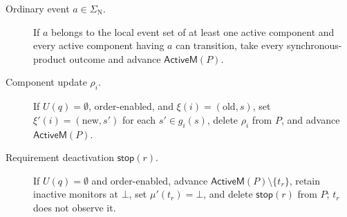 \documentclass[acmsmall,screen,review,anonymous]{acmart}
\newcommand{\ActT}{\mathsf{ActiveM}}
\newcommand{\SigmaN}{\Sigma_{\mathrm{N}}}
\newcommand{\ustop}[1]{\mathsf{stop}(#1)}
\begin{document}
\begin{definition}
\begin{description}
  \item[Ordinary event $a\in\SigmaN$.]
  If $a$ belongs to the local event set of at least one active component and every active component having $a$ can transition, take every synchronous-product outcome and advance $\ActT(P)$.

  \item[Component update $\rho_i$.]
  If $U(q)=\emptyset$, order-enabled, and $\xi(i)=(\mathrm{old},s)$, set $\xi'(i)=(\mathrm{new},s')$ for each $s'\in g_i(s)$, delete $\rho_i$ from $P$, and advance $\ActT(P)$.

  \item[Requirement deactivation $\ustop{r}$.]
  If $U(q)=\emptyset$ and order-enabled, advance $\ActT(P)\setminus\{t_r\}$, retain inactive monitors at $\bot$, set $\mu'(t_r)=\bot$, and delete $\ustop{r}$ from $P$; $t_r$ does not observe it.


\end{description}
\end{definition}
\end{document}
